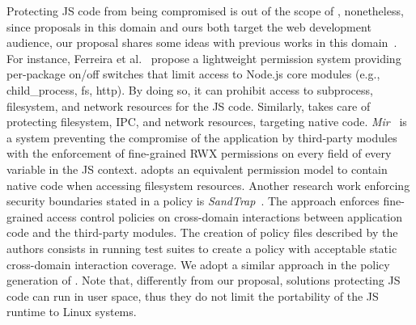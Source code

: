Protecting JS code from being compromised is out of the scope of \pap,
nonetheless, since proposals in this domain and ours both target the
web development audience, our proposal shares some ideas with previous
works in this domain~\cite{vasilakis2021preventing, sandtrap,
  terrace2012javascript, ntousakis2021detecting}. For instance, Ferreira et al.~\cite{
  npm-malicious-update} propose a lightweight permission system providing
per-package on/off switches that limit access to Node.js core modules
(e.g., child\_process, fs, http). By doing so, it can prohibit access
to subprocess, filesystem, and network resources for the JS
code. Similarly, \pap takes care of protecting filesystem, IPC, and
network resources, targeting native code. {\em Mir}~\cite{
  vasilakis2021preventing} is a system preventing the compromise of
the application by third-party modules with the enforcement of
fine-grained RWX permissions on every field of every variable in the
JS context. \pap adopts an equivalent permission model to contain
native code when accessing filesystem resources. Another research work
enforcing security boundaries stated in a policy is {\em
  SandTrap}~\cite{sandtrap}. The approach enforces fine-grained
access control policies on cross-domain interactions between
application code and the third-party modules. The creation of policy
files described by the authors consists in running test suites to
create a policy with acceptable static cross-domain interaction
coverage. We adopt a similar approach in the policy generation of
\pap. Note that, differently from our proposal, solutions protecting
JS code can run in user space, thus they do not limit the portability
of the JS runtime to Linux systems.

